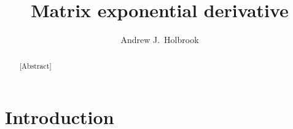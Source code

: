 \documentclass[12pt]{article} %
\title{Matrix exponential derivative}
\date{}
\author{Andrew J.~Holbrook}
\affil{UCLA Biostatistics}
\begin{document}
\maketitle




\begin{abstract}

[Abstract]


\end{abstract}



\section{Introduction}\label{sec:intro}

\newcommand{\QQ}{\mathbf{Q}}
\newcommand{\MM}{\mathbf{M}}
\newcommand{\JJ}{\mathbf{J}}
\newcommand{\II}{\mathbf{I}}
\newcommand{\RR}{\mathbf{R}}
\newcommand{\Zero}{\boldsymbol{0}}
\end{document}

